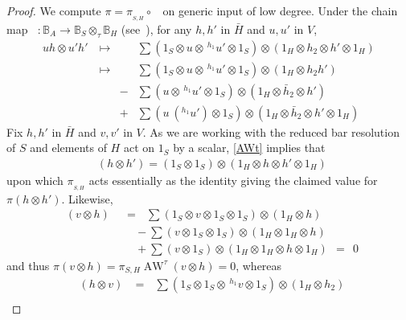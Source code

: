 \documentclass[11pt]{amsart}
\numberwithin{equation}{section}
\newcommand{\BB}{\mathbb{B}} %
\DeclareMathOperator{\AW}{AW}
\DeclareMathOperator{\AWt}{\AW^{\tau}}
\renewcommand{\_}[1]{\mbox{$_{\left( #1 \right)}$}}
\newcommand{\ot}{\otimes}
\newcommand{\ott}{\otimes_{\tau}}
\begin{document}
{\begin{proof}
We compute $\pi=\pi_{_{S,H}}\circ \AWt$ on generic input of low degree.
Under the chain map $\AWt: \BB_A\rightarrow \BB_S\ott \BB_H$ (see~\cite[Section 4]{TTP-AWEZ}),
for any $h,h'$ in $\bar H$ and $u,u'$ in $V$,
\begin{equation}\label{AWt}
  \begin{aligned}
  uh\ot u'h'\ 
  &\longmapsto&
&\sum (1_S\ot u \ot \, ^{h_1} u'\ot 1_S)\ot (1_H\ot h_2\ot h'\ot
  1_H)\\
  &\longmapsto&
  &\sum (1_S\ot u \ot \, ^{h_1} u'\ot 1_S)\ot (1_H\ot h_2h')\\
  && - &\sum (u \ot \, ^{h_1} u'\ot 1_S)\ot (1_H\ot \bar h_2\ot h')\\
 && +  &\sum (u \ ( ^{h_1} u')\ot 1_S)\ot (1_H\ot \bar h_2\ot h'\ot 1_H)\, 
\end{aligned}
\end{equation}
Fix $h,h'$ in $\bar H$ and $v,v'$ in $V$.
As we are working with the reduced bar resolution of $S$
and elements of $H$ act on $1_S$ by a scalar,
\cref{AWt} implies that 
\begin{equation*}
  \begin{aligned}
 \AWt(h\ot h') 
 = (1_S\ot 1_S) \ot (1_H\ot h\ot h'\ot 1_H)
 \end{aligned}
\end{equation*}
%
upon which
$\pi_{_{S,H}}$ acts essentially as the identity 
giving the claimed value for $\pi(h\ot h')$.
Likewise,
\begin{equation*}
  \begin{aligned}
  \AWt( v\ot h) \ \  
 & = \ \ \ 
  \sum (1_S\ot v \ot 1_S \ot 1_S)\ot (1_H\ot h)\\
  & \quad  - \sum (v\ot 1_S \ot 1_S)\ot (1_H\ot 1_H\ot h)\\
  & \quad +  \sum (v \ot 1_S)\ot (1_H\ot 1_H \ot h\ot 1_H) \ \  = \ \   0
\end{aligned}
\end{equation*}
and thus 
$    \pi(v\ot h) = 
\pi_{S,H} \AW^{\tau} ( v\ot h) = 
0$, %
whereas
\begin{equation*}
  \begin{aligned}
  \AWt(h\ot v) 
 & = \ \ \ 
 \sum (1_S\ot 1_S \ot \, ^{h_1} v\ot 1_S)\ot (1_H\ot h_2) \\

\end{aligned}
\end{equation*}
\end{proof}}
\end{document}
